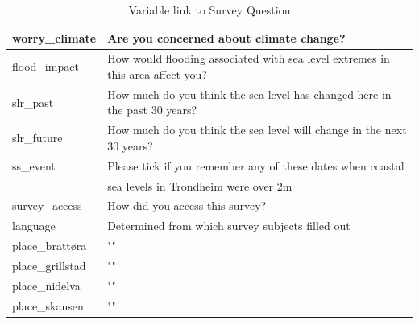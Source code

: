 \begin{center}
\begin{table}[h]
\begin{tabular}{|l|l|}
        worry\_climate &  Are you concerned about climate change? \\ \hline
        flood\_impact &  How would flooding associated with sea level extremes in this area affect you? \\ \hline
        slr\_past & How much do you think the sea level has changed here in the past 30 years? \\ \hline
        slr\_future & How much do you think the sea level will change in the next 30 years? \\ \hline
        ss\_event & Please tick if you remember any of these dates when coastal  \\ \newline
        & sea levels in Trondheim were over 2m \\ \hline
        survey\_access  & How did you access this survey? \\ \hline
        language  & Determined from which survey subjects filled out \\ \hline
        place\_brattøra  & "" \\ \hline
        place\_grillstad  & "" \\ \hline
        place\_nidelva & "" \\ \hline
        place\_skansen & "" \\ \hline
    \end{tabular}
    \caption{Variable link to Survey Question}
\label{table:variable to questions}
\end{table}
\end{center}


